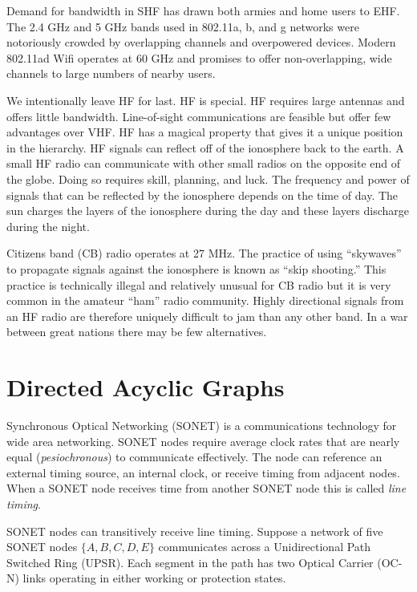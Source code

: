 \documentclass{book}
\begin{document}
Demand for bandwidth in SHF has drawn both armies and home users to EHF. The 2.4 \si{\GHz} and 5 \si{\GHz} bands used in 802.11a, b, and g networks were notoriously crowded by overlapping channels and overpowered devices. Modern 802.11ad Wifi operates at 60 \si{\GHz} and promises to offer non-overlapping, wide channels to large numbers of nearby users.

We intentionally leave HF for last. HF is special. HF requires large antennas and offers little bandwidth. Line-of-sight communications are feasible but offer few advantages over VHF. HF has a magical property that gives it a unique position in the hierarchy. HF signals can reflect off of the ionosphere back to the earth. A small HF radio can communicate with other small radios on the opposite end of the globe. Doing so requires skill, planning, and luck. The frequency and power of signals that can be reflected by the ionosphere depends on the time of day. The sun charges the layers of the ionosphere during the day and these layers discharge during the night.

Citizens band (CB) radio operates at 27 \si{\MHz}. The practice of using ``skywaves'' to propagate signals against the ionosphere is known as ``skip shooting.'' This practice is technically illegal and relatively unusual for CB radio but it is very common in the amateur ``ham'' radio community. Highly directional signals from an HF radio are therefore uniquely difficult to jam than any other band. In a war between great nations there may be few alternatives.

\chapter{Directed Acyclic Graphs}

Synchronous Optical Networking (SONET) is a communications technology for wide area networking. SONET nodes require average clock rates that are nearly equal (\textit{pesiochronous}) to communicate effectively. The node can reference an external timing source, an internal clock, or receive timing from adjacent nodes. When a SONET node receives time from another SONET node this is called \textit{line timing}.

SONET nodes can transitively receive line timing. Suppose a network of five SONET nodes $\{A, B, C, D, E\}$ communicates across a Unidirectional Path Switched Ring (UPSR). Each segment in the path has two Optical Carrier (OC-N) links operating in either working or protection states.
\end{document}
